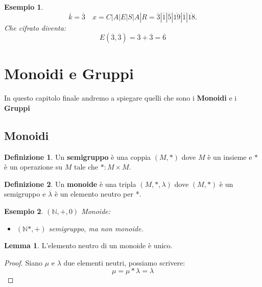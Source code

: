 \documentclass{article}
\newtheorem{exmp}{Esempio}[section]
\theoremstyle{definition}
\newtheorem{definition}{Definizione}[section]
\newtheorem{lemma}{Lemma}[section]
\begin{document}
\begin{exmp}
       \begin{equation*}
               \overline{k} = \overline{3} \quad x = C|A|E|S|A|R = \overline{3}|\overline{1}|\overline{5}|\overline{19}|\overline{1}|\overline{18}.
       \end{equation*}
       Che cifrato diventa:
       \begin{equation*}
               E(\overline{3}, \overline{3}) = \overline{3} + \overline{3} = \overline{6}
       \end{equation*}
\end{exmp}






\newpage
\section{Monoidi e Gruppi}\label{sec:monoidi_e_gruppi}
In questo capitolo finale andremo a spiegare quelli che sono i \textbf{Monoidi} e i \textbf{Gruppi}


\subsection{Monoidi}\label{sec:monoidi}
\begin{definition}
        Un \textbf{semigruppo} è una coppia $(M, *)$ dove $M$ è un insieme e $*$ è un operazione su $M$ tale che $ *: M\times M $. 
\end{definition}
\begin{definition}
       Un \textbf{monoide} è una tripla $ (M, *, \lambda) $ dove $(M, *) $ è un semigruppo e $ \lambda $ è un elemento neutro per *.
\end{definition}

\begin{exmp}
        $  (\mathbb{N},+,0)$ Monoide:
        \begin{itemize}
                \item $(\mathbb{N}*, +)$ semigruppo, ma non monoide.
        \end{itemize}
\end{exmp}

\begin{tcolorbox}
\begin{lemma}
        L'elemento neutro di un monoide è unico.
\end{lemma}
\end{tcolorbox}

 \begin{tcolorbox}
\begin{proof}
       Siano $\mu$ e $ \lambda $ due elementi neutri, possiamo scrivere:
       \begin{equation*}
               \mu = \mu * \lambda = \lambda
       \end{equation*}
\end{proof}
\end{tcolorbox}
\end{document}
